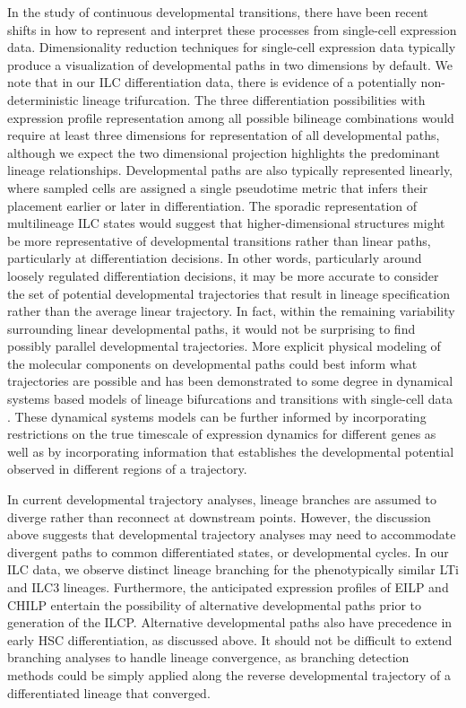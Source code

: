In the study of continuous developmental transitions, there have been recent shifts in how to represent and interpret these processes from single-cell expression data. Dimensionality reduction techniques for single-cell expression data typically produce a visualization of developmental paths in two dimensions by default. We note that in our ILC differentiation data, there is evidence of a potentially non-deterministic lineage trifurcation. The three differentiation possibilities with expression profile representation among all possible bilineage combinations would require at least three dimensions for representation of all developmental paths, although we expect the two dimensional projection highlights the predominant lineage relationships. Developmental paths are also typically represented linearly, where sampled cells are assigned a single pseudotime metric that infers their placement earlier or later in differentiation. The sporadic representation of multilineage ILC states would suggest that higher-dimensional structures might be more representative of developmental transitions rather than linear paths, particularly at differentiation decisions. In other words, particularly around loosely regulated differentiation decisions, it may be more accurate to consider the set of potential developmental trajectories that result in lineage specification rather than the average linear trajectory. In fact, within the remaining variability surrounding linear developmental paths, it would not be surprising to find possibly parallel developmental trajectories. More explicit physical modeling of the molecular components on developmental paths could best inform what trajectories are possible and has been demonstrated to some degree in dynamical systems based models of lineage bifurcations and transitions with single-cell data \cite{marco2014,morris2014}. These dynamical systems models can be further informed by incorporating restrictions on the true timescale of expression dynamics for different genes as well as by incorporating information that establishes the developmental potential observed in different regions of a trajectory. 

In current developmental trajectory analyses, lineage branches are assumed to diverge rather than reconnect at downstream points. However, the discussion above suggests that developmental trajectory analyses may need to accommodate divergent paths to common differentiated states, or developmental cycles. In our ILC data, we observe distinct lineage branching for the phenotypically similar LTi and ILC3 lineages. Furthermore, the anticipated expression profiles of EILP and CHILP entertain the possibility of alternative developmental paths prior to generation of the ILCP. Alternative developmental paths also have precedence in early HSC differentiation, as discussed above. It should not be difficult to extend branching analyses to handle lineage convergence, as branching detection methods could be simply applied along the reverse developmental trajectory of a differentiated lineage that converged.



